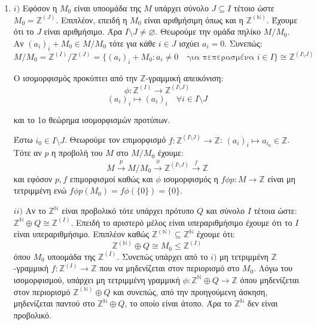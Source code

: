 \documentclass{article}
\begin{document}
\begin{enumerate}
\item $i)$ Εφόσον η $M_0$ είναι υποομάδα της $M$ υπάρχει σύνολο $J \subseteq I$ τέτοιο ώστε $M_0 = \mathbb{Z}^{(J) }$. Επιπλέον, επειδή η $M_0$ είναι αριθμήσιμη όπως και η $\mathbb{Z}^{(\mathbb{N})}$. Έχουμε ότι το $J$ είναι αριθμήσιμο. Άρα $I \setminus J \neq \varnothing$. Θεωρούμε την ομάδα πηλίκο $Μ/Μ_0$. Αν $(a_i)_i + M_0 \in M / M_0$ τότε για κάθε $i \in J$ ισχύει $a_i = 0$. Συνεπώς:
	$$M / M_0 = \mathbb{Z}^{(I)} / \mathbb{Z} ^{(J)} = \{ (a_i)_i + Μ_0 : a_i \neq 0 \quad\text{για πεπερασμένα } i \in I \} \cong \mathbb{Z}^{(I \setminus J)}$$

	Ο ισομορφισμός προκύπτει από την $\mathbb{Z}$-γραμμική απεικόνιση:
	$$\phi : \mathbb{Z}^{(I)} \rightarrow \mathbb{Z}^{(I \setminus J)}  $$
	$$ (a_i)_i \mapsto (a_i)_i \quad\forall i \in I \setminus J$$

και το 1ο θεώρημα ισομορφισμών προτύπων.

Έστω $i_0 \in I \setminus J$. Θεωρούμε τον επιμορφισμό $f: \mathbb{Z}^{(I \setminus J )} \rightarrow \mathbb{Z} $: $(a_i)_i \mapsto a_{i_0} \in \mathbb{Z}$. Τότε αν $p$ η προβολή του $Μ$ στο $M / M_0$ έχουμε:
$$M \xrightarrow{p} M / M_0 \xrightarrow{\phi} \mathbb{Z}^{(I \setminus J)} \xrightarrow{f} \mathbb{Z}$$ και εφόσον $p, f$ επιμορφισμοί καθώς και $\phi$ ισομορφισμός η $f\phi p : M \rightarrow \mathbb{Z}$ είναι μη τετριμμένη ενώ $f\phi p( M_0) = f\phi (\{0\} ) = \{0\}$.
$ $\newline

$ii)$ Αν το $\mathbb{Z}^{\mathbb{N}}$ είναι προβολικό τότε υπάρχει πρότυπο $Q$ και σύνολο $I$ τέτοια ώστε: $\mathbb{Z}^{\mathbb{N}} \oplus Q \cong \mathbb{Z}^{(I)}$. Επειδή το αριστερό μέλος είναι υπεραριθμήσιμο έχουμε ότι το $I$ είναι υπεραριθμήσιμο. Επιπλέον καθώς $\mathbb{Z}^{\left(\mathbb{N}  \right) } \subseteq \mathbb{Z}^{\mathbb{N}}$ έχουμε ότι:
$$\mathbb{Z}^{(\mathbb{N})} \oplus Q \cong M_0 \leq \mathbb{Z}^{(I)}$$
όπου $Μ_0$ υποομάδα της $\mathbb{Z}^{(I)}$. Συνεπώς υπάρχει από το $i)$ μη τετριμμένη $\mathbb{Z}$-γραμμική $f: \mathbb{Z}^{(I)} \rightarrow \mathbb{Z}$ που να μηδενίζεται στον περιορισμό στο $M_0$. Λόγω του ισομορφισμού, υπάρχει μη τετριμμένη γραμμική $\phi : \mathbb{Z}^{\mathbb{N}} \oplus Q \rightarrow \mathbb{Z}$ όπου μηδενίζεται στον περιορισμό $\mathbb{Z}^{(\mathbb{N})} \oplus Q$ και συνεπώς, από την προηγούμενη άσκηση, μηδενίζεται παντού στο $\mathbb{Z}^{\mathbb{N}} \oplus Q$, το οποίο είναι άτοπο. Άρα το $\mathbb{Z}^{\mathbb{N}}$ δεν είναι προβολικό.
$ $\newline


\end{enumerate}
\end{document}
